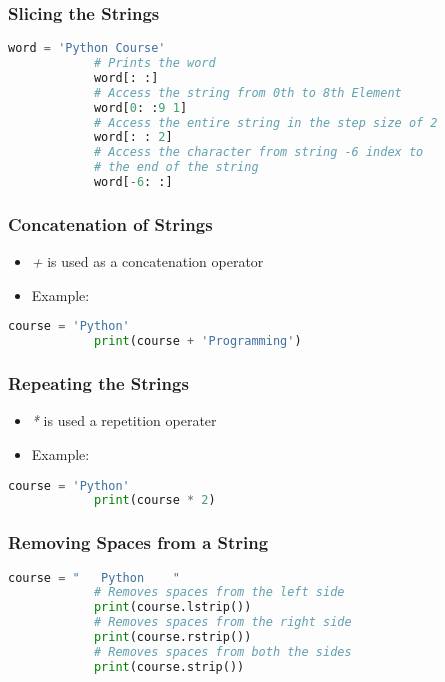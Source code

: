 \documentclass[14pt]{beamer}
\begin{document}
    \begin{frame}[containsverbatim]
        \frametitle{Slicing the Strings}
        \begin{lstlisting}[language=Python]
            word = 'Python Course'
            # Prints the word
            word[: :]
            # Access the string from 0th to 8th Element
            word[0: :9 1]
            # Access the entire string in the step size of 2
            word[: : 2]
            # Access the character from string -6 index to 
            # the end of the string
            word[-6: :]
        \end{lstlisting}
    \end{frame}
    \begin{frame}[containsverbatim]
        \frametitle{Concatenation of Strings}
        \begin{itemize}
            \item \emph{+} is used as a concatenation operator
            \item \alert{Example:}
                
        \end{itemize}
	    \begin{lstlisting}[language=Python]
            course = 'Python'
            print(course + 'Programming')
        \end{lstlisting}
    \end{frame}
    \begin{frame}[containsverbatim]
        \frametitle{Repeating the Strings}
        \begin{itemize}
            \item \emph{*} is used a repetition operater
            \item \alert{Example:}
               
        \end{itemize}
        \begin{lstlisting}[language=Python]
            course = 'Python'
            print(course * 2)
        \end{lstlisting}
    \end{frame}
    \begin{frame}[containsverbatim]
        \frametitle{Removing Spaces from a String}
        \begin{lstlisting}[language=Python]
            course = "   Python    "
            # Removes spaces from the left side
            print(course.lstrip())
            # Removes spaces from the right side
            print(course.rstrip())
            # Removes spaces from both the sides
            print(course.strip())
        \end{lstlisting}
    \end{frame}
\end{document}
